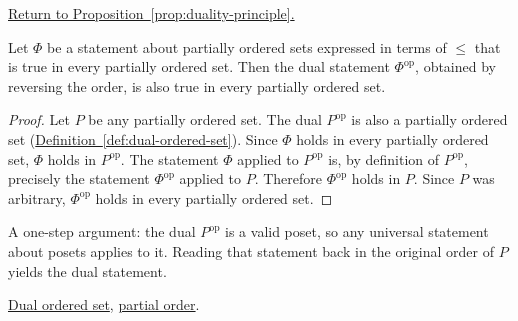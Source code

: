
\newpage
{}
\label{prf:duality-principle}

\begin{remark*}[Return]
\hyperref[prop:duality-principle]{Return to Proposition~\ref*{prop:duality-principle}.}
\end{remark*}

\begin{theorem*}
Let $\Phi$ be a statement about partially ordered sets expressed in terms
of $\leq$ that is true in every partially ordered set.  Then the dual
statement $\Phi^{\mathrm{op}}$, obtained by reversing the order, is also
true in every partially ordered set.
\end{theorem*}

\begin{proof}[Proof]
Let $P$ be any partially ordered set.  The dual $P^{\mathrm{op}}$ is
also a partially ordered set
(\hyperref[def:dual-ordered-set]{Definition~\ref*{def:dual-ordered-set}}).
Since $\Phi$ holds in every partially ordered set, $\Phi$ holds in
$P^{\mathrm{op}}$.  The statement $\Phi$ applied to $P^{\mathrm{op}}$ is,
by definition of $P^{\mathrm{op}}$, precisely the statement $\Phi^{\mathrm{op}}$
applied to $P$.  Therefore $\Phi^{\mathrm{op}}$ holds in $P$.  Since $P$
was arbitrary, $\Phi^{\mathrm{op}}$ holds in every partially ordered set.
\end{proof}

\begin{remark*}
A one-step argument: the dual $P^{\mathrm{op}}$ is a valid poset, so
any universal statement about posets applies to it.  Reading that
statement back in the original order of $P$ yields the dual statement.
\end{remark*}

\begin{remark*}[Dependencies]
\hyperref[def:dual-ordered-set]{Dual ordered set},
\hyperref[def:lattice-order-partial-order]{partial order}.
\end{remark*}
